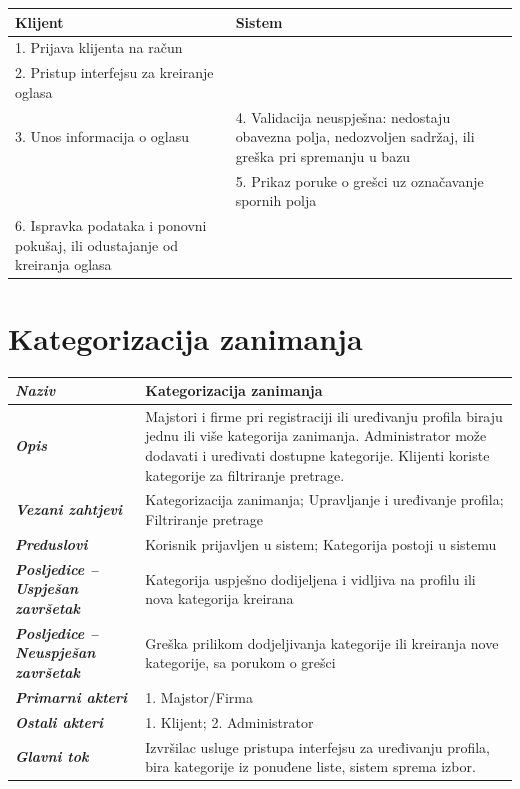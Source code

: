 \documentclass[12pt,a4paper]{article}
\newcommand{\usecase}[9]{%
\begin{longtable}{|L{4cm}|L{11cm}|}
\hline
\textbf{\textit{Naziv}} & \textbf{#1} \\
\hline
\textbf{\textit{Opis}} & #2 \\
\hline
\textbf{\textit{Vezani zahtjevi}} & #3 \\
\hline
\textbf{\textit{Preduslovi}} & #4 \\
\hline
\textbf{\textit{Posljedice -- Uspješan završetak}} & #5 \\
\hline
\textbf{\textit{Posljedice -- Neuspješan završetak}} & #6 \\
\hline
\textbf{\textit{Primarni akteri}} & #7 \\
\hline
\textbf{\textit{Ostali akteri}} & #8 \\
\hline
\textbf{\textit{Glavni tok}} & #9 \\
\hline
\end{longtable}%
}
\begin{document}
\begin{longtable}{|L{7.5cm}|L{7.5cm}|}
    \hline
    \textbf{Klijent}                                                            & \textbf{Sistem}                                                                                          \\
    . Prijava klijenta na račun                                                &                                                                                                          \\
    . Pristup interfejsu za kreiranje oglasa                                   &                                                                                                          \\
    . Unos informacija o oglasu                                                & 4. Validacija neuspješna: nedostaju obavezna polja, nedozvoljen sadržaj, ili greška pri spremanju u bazu \\
    \hline
                                                                                & 5. Prikaz poruke o grešci uz označavanje spornih polja                                                   \\
    . Ispravka podataka i ponovni pokušaj, ili odustajanje od kreiranja oglasa &                                                                                                          \\
    \hline
\end{longtable}
\newpage
\section{Kategorizacija zanimanja}

\usecase
{Kategorizacija zanimanja}
{Majstori i firme pri registraciji ili uređivanju profila biraju jednu ili više kategorija zanimanja. Administrator može dodavati i uređivati dostupne kategorije. Klijenti koriste kategorije za filtriranje pretrage.}
{Kategorizacija zanimanja; Upravljanje i uređivanje profila; Filtriranje pretrage}
{Korisnik prijavljen u sistem; Kategorija postoji u sistemu}
{Kategorija uspješno dodijeljena i vidljiva na profilu ili nova kategorija kreirana}
{Greška prilikom dodjeljivanja kategorije ili kreiranja nove kategorije, sa porukom o grešci}
{1. Majstor/Firma}
{1. Klijent; 2. Administrator}
{Izvršilac usluge pristupa interfejsu za uređivanju profila, bira kategorije iz ponuđene liste, sistem sprema izbor.}
\end{document}
